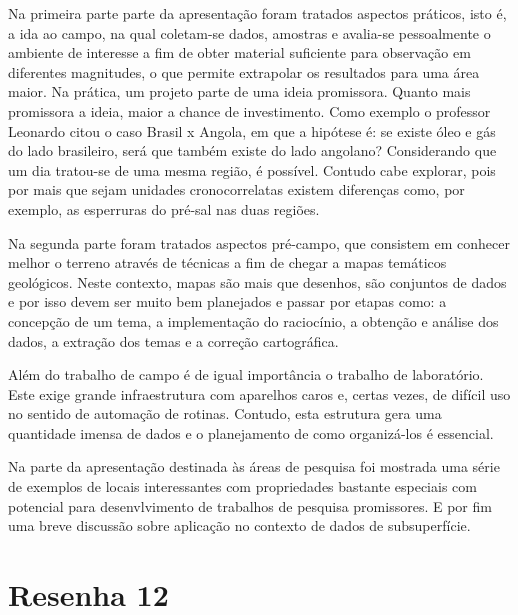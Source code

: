 \documentclass[
	12pt,				%
	openright,			%
	twoside,			%
	a4paper,			%
	english,			%
	brazil,				%
	svgnames
	]{abntex2}\usepackage[]{graphicx}\usepackage[]{color}
\begin{document}
Na primeira parte parte da apresentação foram tratados aspectos práticos, isto é, a ida ao campo, na qual coletam-se dados, amostras e avalia-se pessoalmente o ambiente de interesse a fim de obter material suficiente para observação em diferentes magnitudes, o que permite extrapolar os resultados para uma área maior. Na prática, um projeto parte de uma ideia promissora. Quanto mais promissora a ideia, maior a chance de investimento. Como exemplo o professor Leonardo citou o caso Brasil x Angola, em que a hipótese é: se existe óleo e gás do lado brasileiro, será que também existe do lado angolano? Considerando que um dia tratou-se de uma mesma região, é possível. Contudo cabe explorar, pois por mais que sejam unidades cronocorrelatas existem diferenças como, por exemplo, as esperruras do pré-sal nas duas regiões.

Na segunda parte foram tratados aspectos pré-campo, que consistem em conhecer melhor o terreno através de técnicas a fim de chegar a mapas temáticos geológicos. Neste contexto, mapas são mais que desenhos, são conjuntos de dados e por isso devem ser muito bem planejados e passar por etapas como: a concepção de um tema, a implementação do raciocínio, a obtenção e análise dos dados, a extração dos temas e a correção cartográfica.

Além do trabalho de campo é de igual importância o trabalho de laboratório. Este exige grande infraestrutura com aparelhos caros e, certas vezes, de difícil uso no sentido de automação de rotinas. Contudo, esta estrutura gera uma quantidade imensa de dados e o planejamento de como organizá-los é essencial.

Na parte da apresentação destinada às áreas de pesquisa foi mostrada uma série de exemplos de locais interessantes com propriedades bastante especiais com potencial para desenvlvimento de trabalhos de pesquisa promissores. E por fim uma breve discussão sobre aplicação no contexto de dados de subsuperfície.



\chapter{Resenha 12}
\label{cap:res12}

% 



\end{document}
